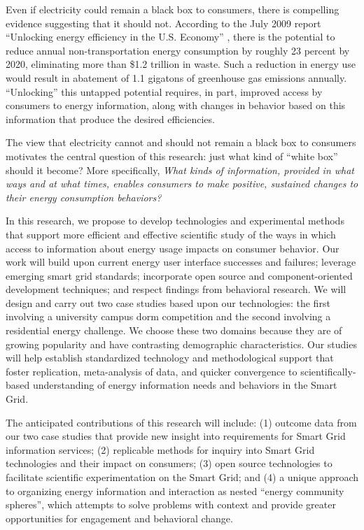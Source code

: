 Even if electricity could remain a black box to consumers, there is
compelling evidence suggesting that it should not.  According to the July
2009 report ``Unlocking energy efficiency in the U.S. Economy''
\cite{Granade09}, there is the potential to reduce annual
non-transportation energy consumption by roughly 23 percent by 2020,
eliminating more than \$1.2 trillion in waste.  Such a reduction in energy
use would result in abatement of 1.1 gigatons of greenhouse gas emissions
annually. ``Unlocking'' this untapped potential requires, in part, improved
access by consumers to energy information, along with changes in behavior
based on this information that produce the desired efficiencies.

The view that electricity cannot and should not remain a black box to
consumers motivates the central question of this research: just what kind of
``white box'' should it become?  More specifically, {\em What kinds of
  information, provided in what ways and at what times, enables consumers
  to make positive, sustained changes to their energy consumption
  behaviors?}

In this research, we propose to develop technologies and experimental
methods that support more efficient and effective scientific study of the
ways in which access to information about energy usage impacts on consumer
behavior.  Our work will build upon current energy user interface successes
and failures; leverage emerging smart grid standards; incorporate open
source and component-oriented development techniques; and respect findings
from behavioral research. We will design and carry out two case studies
based upon our technologies: the first involving a university campus dorm
competition and the second involving a residential energy challenge. We
choose these two domains because they are of growing popularity and have
contrasting demographic characteristics.  Our studies will help establish
standardized technology and methodological support that foster replication,
meta-analysis of data, and quicker convergence to scientifically-based
understanding of energy information needs and behaviors in the Smart Grid.

The anticipated contributions of this research will include: (1) outcome
data from our two case studies that provide new insight into requirements
for Smart Grid information services; (2) replicable methods for inquiry
into Smart Grid technologies and their impact on consumers; (3) open
source technologies to facilitate scientific experimentation on the Smart
Grid; and (4) a unique approach to organizing energy information and
interaction as nested ``energy community spheres'', which attempts to solve
problems with context and provide greater opportunities for engagement and
behavioral change.

